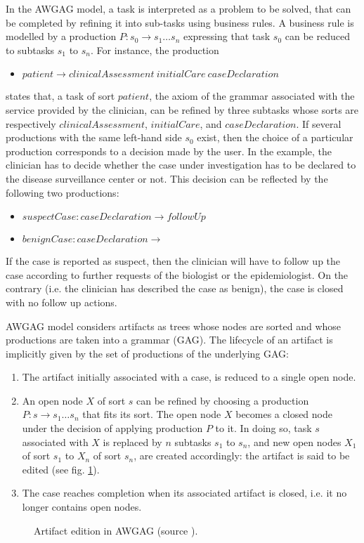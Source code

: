 In the AWGAG model, a task is interpreted as a problem to be solved, that can be completed by refining it into sub-tasks using business rules. A business rule is modelled by a production $P: s_0 \rightarrow s_1 \ldots s_n$ expressing that task $s_0$ can be reduced to subtasks $s_1$ to $s_n$. For instance, the production 
\begin{itemize}
	\item[] $patient \rightarrow clinicalAssessment \ initialCare \ caseDeclaration$
\end{itemize}
states that, a task of sort $patient$, the axiom of the grammar associated with the service provided by the clinician, can be refined by three subtasks whose sorts are respectively $clinicalAssessment$, $initialCare$, and $caseDeclaration$. If several productions with the same left-hand side $s_0$ exist, then the choice of a particular production corresponds to a decision made by the user. In the example, the clinician has to decide whether the case under investigation has to be declared to the disease surveillance center or not. This decision can be reflected by the following two productions:
\begin{itemize}
	\item[] $suspectCase: caseDeclaration \rightarrow followUp$
	\item[] $benignCase: caseDeclaration \rightarrow$
\end{itemize}
If the case is reported as suspect, then the clinician will have to follow up the case according to further requests of the biologist or the epidemiologist. On the contrary (i.e. the clinician has described the case as benign), the case is closed with no follow up actions.

AWGAG  model considers artifacts as trees whose nodes are sorted and whose productions are taken into a grammar (GAG). The lifecycle of an artifact is implicitly given by the set of productions of the underlying GAG:
\begin{enumerate}
	\item The artifact initially associated with a case, is reduced to a single open node.
	\item An open node $X$ of sort $s$ can be refined by choosing a production $P: s \rightarrow s_1 \ldots s_n$ that fits its sort. The open node $X$ becomes a closed node under the decision of applying production $P$ to it. In doing so, task $s$ associated with $X$ is replaced by $n$ subtasks $s_1$ to $s_n$, and new open nodes $X_1$ of sort $s_1$ to $X_n$ of sort $s_n$, are created accordingly: the artifact is said to be edited (see fig. \ref{chap1:fig:aw-artifact-edition}).
	\item The case reaches completion when its associated artifact is closed, i.e. it no longer contains open nodes.
\end{enumerate}
\begin{figure}[ht!]
	\noindent
	\caption{Artifact edition in AWGAG (source \cite{badouel2015active}).}
	\label{chap1:fig:aw-artifact-edition}
\end{figure}

